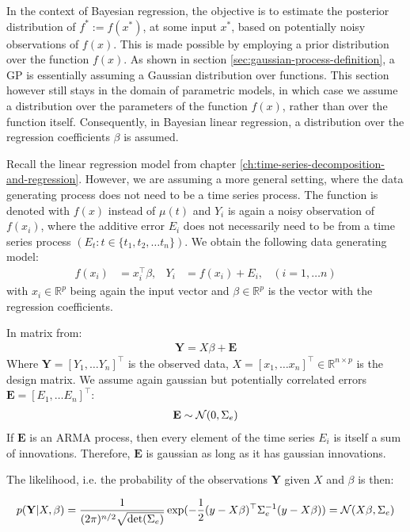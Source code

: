 In the context of Bayesian regression, the objective is to estimate the posterior distribution of
$f^{\ast} := f(x^{\ast})$, at some input $x^{\ast}$, based on potentially noisy observations of $f(x)$.
This is made possible by employing a prior distribution
over the function $f(x)$.
As shown in section \ref{sec:gaussian-process-definition}, a GP is essentially
assuming a Gaussian distribution over functions.
This section however still stays in the domain of parametric models,
in which case we assume a distribution over the parameters of the function $f(x)$,
rather than over the function itself.
Consequently, in Bayesian linear regression, a distribution over the regression coefficients $\beta$ is assumed.


Recall the linear regression model from chapter \ref{ch:time-series-decomposition-and-regression}.
However, we are assuming a more general setting, where the data generating process does not need to be a time series process.
The function is denoted with $f(x)$ instead of $\mu(t)$ and $Y_i$ is again a noisy observation of
$f(x_i)$, where the additive error $E_i$ does not necessarily need to be from a time series process $(E_t: t \in \{t_1, t_2, \dots  t_n \})$.
We obtain the following data generating model:
\begin{align*}
    f(x_i) &= x_i^{\top}\beta, & Y_i &= f(x_i) + E_i,  & (i = 1, \dots n)
\end{align*}
with $x_i \in \mathbb{R}^p$ being again the input vector and $\beta \in \mathbb{R}^p$ is the vector with
the regression coefficients.

In matrix from:
\begin{align*}
    \mathbf{Y} = X \beta + \mathbf{E}
\end{align*}
Where $\mathbf{Y} = [Y_{1}, \dots Y_{n}]^{\top}$ is the observed data,
$X = [x_{1}, \dots x_{n}]^{\top} \in \mathbb{R}^{n \times p}$ is the design matrix.
We assume again gaussian but potentially correlated errors $\mathbf{E} = [E_{1}, \dots E_{n}]^{\top}$:
\begin{gather*}
    \mathbf{E} \sim \operatorname{\mathcal{N}}(0, \Sigma_e)
\end{gather*}
If $\mathbf{E}$ is an ARMA process, then every element of the time series $E_{i}$
is itself a sum of innovations.
Therefore, $\mathbf{E}$ is gaussian as long as it has gaussian innovations.

The likelihood, i.e. the probability of the observations $\mathbf{Y}$ given $X$ and $\beta$ is then:

\begin{gather*}
    p(\mathbf{Y}|X,\beta)
    = \frac{1}{(2\pi)^{n/2} \sqrt {\det(\Sigma_e)}}
    \exp(-\frac{1}{2}(y - X\beta)^{\top} \Sigma_e^{-1}(y-X\beta))
    = \operatorname{\mathcal{N}}(X \beta, \Sigma_e)
\end{gather*}

